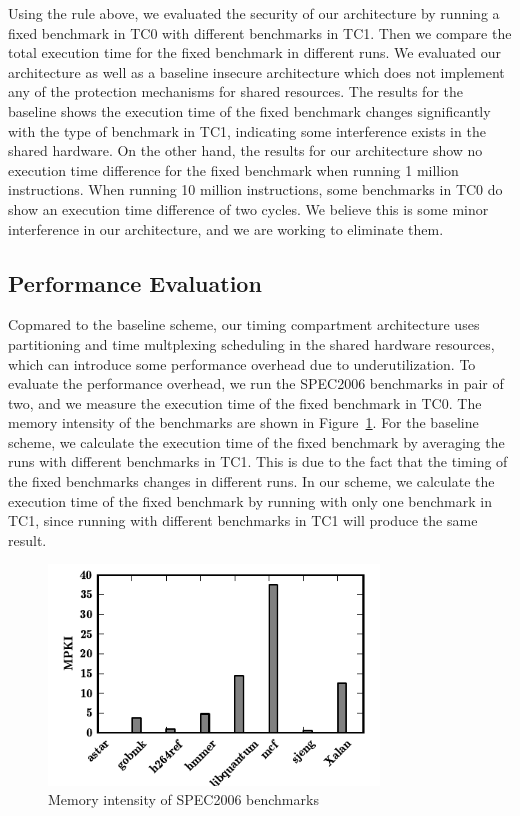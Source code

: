 Using the rule above, we evaluated the security of our architecture by running a fixed benchmark
in TC0 with different benchmarks in TC1. Then we compare the total execution time for the fixed
benchmark in different runs. We evaluated our architecture as well as a baseline insecure architecture 
which does not implement any of the protection mechanisms for shared resources. The results for
the baseline shows the execution time of the fixed benchmark changes significantly with the type
of benchmark in TC1, indicating some interference exists in the shared hardware. On the other hand,
the results for our architecture show no execution time difference for the fixed benchmark when
running 1 million instructions. When running 10 million instructions, some benchmarks in TC0
do show an execution time difference of two cycles. We believe this is some minor interference
in our architecture, and we are working to eliminate them.

\subsection{Performance Evaluation}
Copmared to the baseline scheme, our timing compartment architecture uses partitioning and time multplexing
scheduling in the shared hardware resources, which can introduce some performance overhead due to
underutilization. To evaluate the performance overhead, we run the SPEC2006 benchmarks in pair of two, and
we measure the execution time of the fixed benchmark in TC0. The memory intensity of the benchmarks are shown
in Figure~\ref{fig:memstudy}. For the baseline scheme, we calculate the execution time of the fixed benchmark
by averaging the runs with different benchmarks in TC1. This is due to the fact that the timing of the fixed
benchmarks changes in different runs. In our scheme, we calculate the execution time of the fixed benchmark by
running with only one benchmark in TC1, since running with different benchmarks in TC1 will produce the same
result.

\begin{figure}
    \begin{center}
        \includegraphics[width=3.46in]{figs/memstudy.pdf}
        \caption{Memory intensity of SPEC2006 benchmarks}
        \label{fig:memstudy}
    \end{center}
\end{figure}


